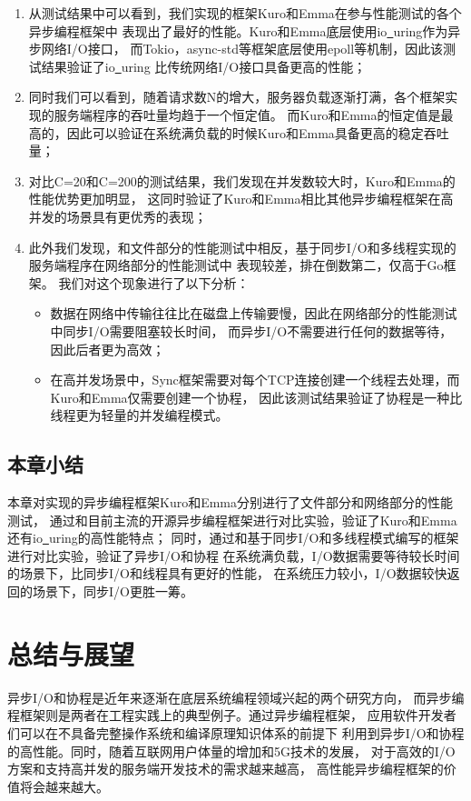 \documentclass[supercite]{HustGraduPaper}
\theoremstyle{definition}
\begin{document}
\begin{enumerate}
  \item 从测试结果中可以看到，我们实现的框架Kuro和Emma在参与性能测试的各个异步编程框架中
    表现出了最好的性能。Kuro和Emma底层使用io\underline{~}uring作为异步网络I/O接口，
    而Tokio，async-std等框架底层使用epoll等机制，因此该测试结果验证了io\underline{~}uring
    比传统网络I/O接口具备更高的性能；
  \item 同时我们可以看到，随着请求数N的增大，服务器负载逐渐打满，各个框架实现的服务端程序的吞吐量均趋于一个恒定值。
    而Kuro和Emma的恒定值是最高的，因此可以验证在系统满负载的时候Kuro和Emma具备更高的稳定吞吐量；
  \item 对比C=20和C=200的测试结果，我们发现在并发数较大时，Kuro和Emma的性能优势更加明显，
    这同时验证了Kuro和Emma相比其他异步编程框架在高并发的场景具有更优秀的表现；
  \item 此外我们发现，和文件部分的性能测试中相反，基于同步I/O和多线程实现的服务端程序在网络部分的性能测试中
    表现较差，排在倒数第二，仅高于Go框架。
    我们对这个现象进行了以下分析：
    \begin{itemize}
      \item 数据在网络中传输往往比在磁盘上传输要慢，因此在网络部分的性能测试中同步I/O需要阻塞较长时间，
        而异步I/O不需要进行任何的数据等待，因此后者更为高效；
      \item 在高并发场景中，Sync框架需要对每个TCP连接创建一个线程去处理，而Kuro和Emma仅需要创建一个协程，
        因此该测试结果验证了协程是一种比线程更为轻量的并发编程模式。
    \end{itemize}
\end{enumerate}

\subsection{本章小结}
本章对实现的异步编程框架Kuro和Emma分别进行了文件部分和网络部分的性能测试，
通过和目前主流的开源异步编程框架进行对比实验，验证了Kuro和Emma还有io\underline{~}uring的高性能特点；
同时，通过和基于同步I/O和多线程模式编写的框架进行对比实验，验证了异步I/O和协程
在系统满负载，I/O数据需要等待较长时间的场景下，比同步I/O和线程具有更好的性能，
在系统压力较小，I/O数据较快返回的场景下，同步I/O更胜一筹。\par

\section{总结与展望}
异步I/O和协程是近年来逐渐在底层系统编程领域兴起的两个研究方向，
而异步编程框架则是两者在工程实践上的典型例子。通过异步编程框架，
应用软件开发者们可以在不具备完整操作系统和编译原理知识体系的前提下
利用到异步I/O和协程的高性能。同时，随着互联网用户体量的增加和5G技术的发展，
对于高效的I/O方案和支持高并发的服务端开发技术的需求越来越高，
高性能异步编程框架的价值将会越来越大。\par
\end{document}
